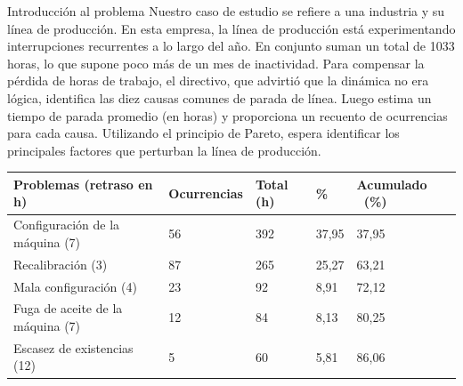 \documentclass{article}
\theoremstyle{mytheoremstyle}
\theoremstyle{mytheoremstyle}
\theoremstyle{myproblemstyle}
\begin{document}
\begin{enumerate}
\begin{itemize}
Introducción al problema\newline
Nuestro caso de estudio se refiere a una industria y su línea de
producción. En esta empresa, la línea de producción está
experimentando interrupciones recurrentes a lo largo del año. En conjunto
suman un total de 1033 horas, lo que supone poco más de un
mes de inactividad. Para compensar la pérdida de horas de trabajo,
el directivo, que advirtió que la dinámica no era lógica,
identifica las diez causas comunes de parada de línea. Luego estima
un tiempo de parada promedio (en horas) y proporciona un recuento
de ocurrencias para cada causa. Utilizando el principio de
Pareto, espera identificar los principales factores que perturban la línea
de producción.
\begin{table}[h!]
	\begin{tabular}{|l|l|l|l|l|}
	\hline 
	\multicolumn{1}{|p{155.83218pt}}{\raggedright Problemas (retraso en h)} & \multicolumn{1}{|p{61.730625pt}}{\raggedright Ocurrencias} & \multicolumn{1}{|p{48.18pt}}{\raggedright Total (h)} & \multicolumn{1}{|p{41.404686pt}}{\raggedright \%} & \multicolumn{1}{|p{60.225pt}|}{\raggedright Acumulado \ (\%)}\\ 
	\hline 
	\multicolumn{1}{|p{155.83218pt}}{\raggedright Configuraci\'on de la m\'aquina (7)} & \multicolumn{1}{|p{61.730625pt}}{\raggedright 56} & \multicolumn{1}{|p{48.18pt}}{\raggedright 392} & \multicolumn{1}{|p{41.404686pt}}{\raggedright 37,95} & \multicolumn{1}{|p{60.225pt}|}{\raggedright 37,95}\\ 
	\hline 
	\multicolumn{1}{|p{155.83218pt}}{\raggedright Recalibraci\'on (3)} & \multicolumn{1}{|p{61.730625pt}}{\raggedright 87} & \multicolumn{1}{|p{48.18pt}}{\raggedright 265} & \multicolumn{1}{|p{41.404686pt}}{\raggedright 25,27} & \multicolumn{1}{|p{60.225pt}|}{\raggedright 63,21}\\ 
	\hline 
	\multicolumn{1}{|p{155.83218pt}}{\raggedright Mala configuraci\'on (4)} & \multicolumn{1}{|p{61.730625pt}}{\raggedright 23} & \multicolumn{1}{|p{48.18pt}}{\raggedright 92} & \multicolumn{1}{|p{41.404686pt}}{\raggedright 8,91} & \multicolumn{1}{|p{60.225pt}|}{\raggedright 72,12}\\ 
	\hline 
	\multicolumn{1}{|p{155.83218pt}}{\raggedright Fuga de aceite de la m\'aquina (7)} & \multicolumn{1}{|p{61.730625pt}}{\raggedright 12} & \multicolumn{1}{|p{48.18pt}}{\raggedright 84} & \multicolumn{1}{|p{41.404686pt}}{\raggedright 8,13} & \multicolumn{1}{|p{60.225pt}|}{\raggedright 80,25}\\ 
	\hline 
	\multicolumn{1}{|p{155.83218pt}}{\raggedright Escasez de existencias (12)} & \multicolumn{1}{|p{61.730625pt}}{\raggedright 5} & \multicolumn{1}{|p{48.18pt}}{\raggedright 60} & \multicolumn{1}{|p{41.404686pt}}{\raggedright 5,81} & \multicolumn{1}{|p{60.225pt}|}{\raggedright 86,06}\\ 

\end{tabular}
\end{table}
\end{itemize}
\end{enumerate}
\end{document}
